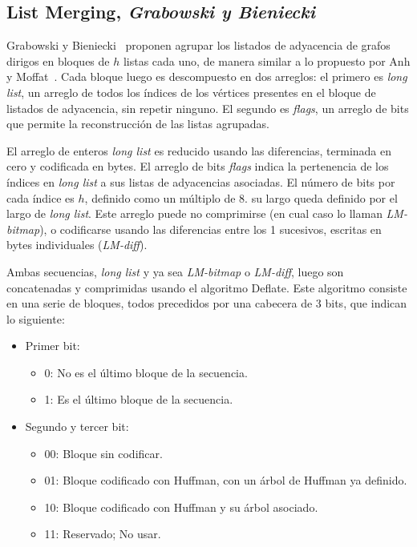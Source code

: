 \subsection{List Merging, \textit{Grabowski y Bieniecki}}
Grabowski y Bieniecki~\cite{grabowski2014tight} proponen agrupar los listados de adyacencia de grafos dirigos en bloques de $h$ listas cada uno, de manera similar a lo propuesto por Anh y Moffat~\cite{anh2010local}. Cada bloque luego es descompuesto en dos arreglos: el primero es \textit{long list}, un arreglo de todos los índices de los vértices presentes en el bloque de listados de adyacencia, sin repetir ninguno. El segundo es \textit{flags}, un arreglo de bits que permite la reconstrucción de las listas agrupadas. 

El arreglo de enteros \textit{long list} es reducido usando las diferencias, terminada en cero y codificada en bytes. El arreglo de bits \textit{flags} indica la pertenencia de los índices en \textit{long list} a sus listas de adyacencias asociadas. El número de bits por cada índice es $h$, definido como un múltiplo de 8. su largo queda definido por el largo de \textit{long list}. Este arreglo puede no comprimirse (en cual caso lo llaman \textit{LM-bitmap}), o codificarse usando las diferencias entre los 1 sucesivos, escritas en bytes individuales (\textit{LM-diff}).

Ambas secuencias, \textit{long list} y ya sea \textit{LM-bitmap} o \textit{LM-diff}, luego son concatenadas y comprimidas usando el algoritmo Deflate. Este algoritmo consiste en una serie de bloques, todos precedidos por una cabecera de 3 bits, que indican lo siguiente:

\begin{itemize}
	\item Primer bit:
	\begin{itemize}
		\item 0: No es el último bloque de la secuencia.
		\item 1: Es el último bloque de la secuencia.
	\end{itemize}
	\item Segundo y tercer bit:
	\begin{itemize}
		\item 00: Bloque sin codificar.
		\item 01: Bloque codificado con Huffman, con un árbol de Huffman ya definido.
		\item 10: Bloque codificado con Huffman y su árbol asociado.
		\item 11: Reservado; No usar.
	\end{itemize}
\end{itemize}

